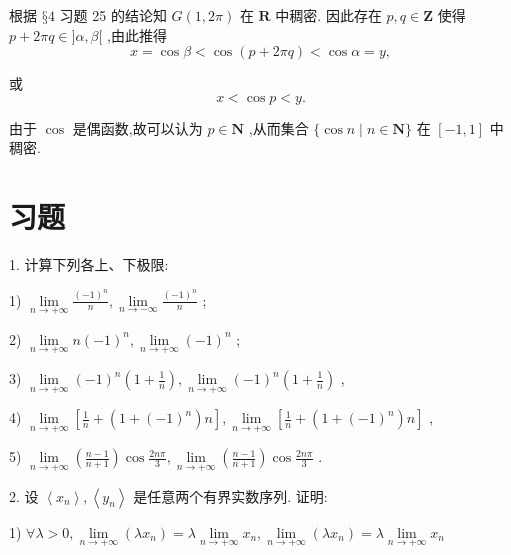 根据 $§4$ 习题 25 的结论知 $G\left( {1,{2\pi }}\right)$ 在 $\mathbf{R}$ 中稠密. 因此存在 $p,q \in  \mathbf{Z}$ 使得 $p + {2\pi q} \in  \rbrack \alpha ,\beta \lbrack$ ,由此推得
$$x = \cos \beta  < \cos \left( {p + {2\pi q}}\right)  < \cos \alpha  = y,$$

或
$$x < \cos p < y.$$

由于 $\cos$ 是偶函数,故可以认为 $p \in  \mathbf{N}$ ,从而集合 $\{ \cos n \mid  n \in  \mathbf{N}\}$ 在 $\left\lbrack  {-1,1}\right\rbrack$ 中稠密.

\section*{习题}

1. 计算下列各上、下极限:

1) $\mathop{\lim }\limits_{{n \rightarrow   + \infty }}\frac{{\left( -1\right) }^{n}}{n},\mathop{\lim }\limits_{{n \rightarrow   - \infty }}\frac{{\left( -1\right) }^{n}}{n}$ ;

2) $\mathop{\lim }\limits_{{n \rightarrow   + \infty }}n{\left( -1\right) }^{n},\mathop{\lim }\limits_{{n \rightarrow   + \infty }}{\left( -1\right) }^{n}$ ;

3) $\mathop{\lim }\limits_{{n \rightarrow   + \infty }}{\left( -1\right) }^{n}\left( {1 + \frac{1}{n}}\right) ,\mathop{\lim }\limits_{{n \rightarrow   + \infty }}{\left( -1\right) }^{n}\left( {1 + \frac{1}{n}}\right)$ ,

4) $\mathop{\lim }\limits_{{n \rightarrow   + \infty }}\left\lbrack  {\frac{1}{n} + \left( {1 + {\left( -1\right) }^{n}}\right) n}\right\rbrack  ,\mathop{\lim }\limits_{{n \rightarrow   + \infty }}\left\lbrack  {\frac{1}{n} + \left( {1 + {\left( -1\right) }^{n}}\right) n}\right\rbrack$ ,

5) $\mathop{\lim }\limits_{{n \rightarrow   + \infty }}\left( \frac{n - 1}{n + 1}\right) \cos \frac{2n\pi }{3},\mathop{\lim }\limits_{{n \rightarrow   + \infty }}\left( \frac{n - 1}{n + 1}\right) \cos \frac{2n\pi }{3}$ .

2. 设 $\left\langle  {x}_{n}\right\rangle  ,\left\langle  {y}_{n}\right\rangle$ 是任意两个有界实数序列. 证明:

1) $\forall \lambda  > 0,\mathop{\lim }\limits_{{n \rightarrow   + \infty }}\left( {\lambda {x}_{n}}\right)  = \lambda \mathop{\lim }\limits_{{n \rightarrow   + \infty }}{x}_{n},\mathop{\lim }\limits_{{n \rightarrow   + \infty }}\left( {\lambda {x}_{n}}\right)  = \lambda \mathop{\lim }\limits_{{n \rightarrow   + \infty }}{x}_{n}$

